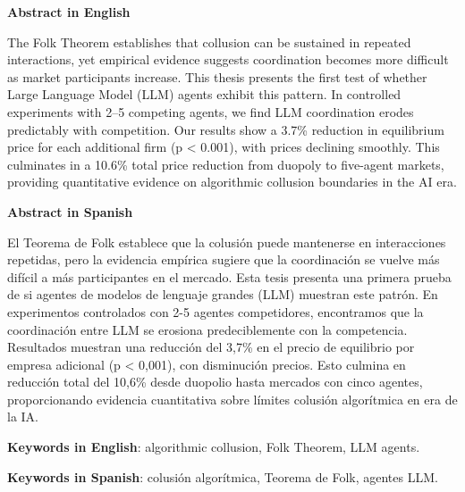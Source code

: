 \documentclass[12pt]{article}
\begin{document}
\begin{titlepage}
    {\LARGE\bfseries Abstract in English\par}
    \vspace{0.5cm}
    The Folk Theorem establishes that collusion can be sustained in repeated interactions, yet empirical evidence suggests coordination becomes more difficult as market participants increase. This thesis presents the first test of whether Large Language Model (LLM) agents exhibit this pattern. In controlled experiments with 2--5 competing agents, we find LLM coordination erodes predictably with competition. Our results show a 3.7\% reduction in equilibrium price for each additional firm (p < 0.001), with prices declining smoothly. This culminates in a 10.6\% total price reduction from duopoly to five-agent markets, providing quantitative evidence on algorithmic collusion boundaries in the AI era.

    \vspace{1.5cm}

    {\LARGE\bfseries Abstract in Spanish\par}
    \vspace{0.5cm}
    El Teorema de Folk establece que la colusión puede mantenerse en interacciones repetidas, pero la evidencia empírica sugiere que la coordinación se vuelve más difícil a más participantes en el mercado. Esta tesis presenta una primera prueba  de si agentes de modelos de lenguaje grandes (LLM) muestran este patrón. En experimentos controlados con 2-5 agentes competidores, encontramos que la coordinación entre LLM se erosiona predeciblemente con la competencia. Resultados muestran una reducción del 3,7\% en el precio de equilibrio por empresa adicional (p < 0,001), con disminución precios. Esto culmina en reducción total del 10,6\% desde duopolio hasta mercados con cinco agentes, proporcionando evidencia cuantitativa sobre límites colusión algorítmica en era de la IA. 

    \vfill

    {\large \textbf{Keywords in English}: algorithmic collusion, Folk Theorem, LLM agents.\par}
    
    \vspace{0.5cm}

    {\large \textbf{Keywords in Spanish}: colusión algorítmica, Teorema de Folk, agentes LLM.\par}
    \vspace{2cm}

\end{titlepage}
\end{document}
